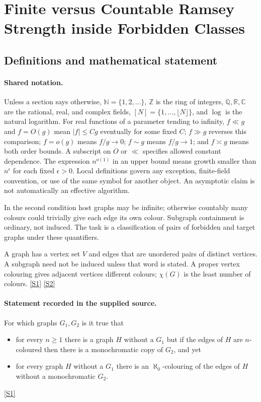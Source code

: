 \documentclass[11pt,a4paper]{article}
\newcommand{\N}{\mathbb{N}}
\newcommand{\Z}{\mathbb{Z}}
\newcommand{\Q}{\mathbb{Q}}
\newcommand{\R}{\mathbb{R}}
\newcommand{\C}{\mathbb{C}}
\newcommand{\sref}[2]{\hyperlink{source:#1:#2}{[S#2]}}
\begin{document}
\section{Finite versus Countable Ramsey Strength inside Forbidden Classes}\label{statement}


\subsection{Definitions and mathematical statement}

\paragraph{Shared notation.}Unless a section says otherwise, $\N=\{1,2,\ldots\}$,
$\Z$ is the ring of integers, $\Q,\R,\C$ are the rational, real, and complex
fields, $[N]=\{1,\ldots,\lfloor N\rfloor\}$, and $\log$ is the natural
logarithm. For real functions of a parameter tending to infinity,
$f\ll g$ and $f=O(g)$ mean $|f|\leq Cg$ eventually for some fixed $C$;
$f\gg g$ reverses this comparison; $f=o(g)$ means $f/g\to0$;
$f\sim g$ means $f/g\to1$; and $f\asymp g$ means both order bounds.
A subscript on $O$ or $\ll$ specifies allowed constant dependence.
The expression $n^{o(1)}$ in an upper bound means growth smaller than
$n^\epsilon$ for each fixed $\epsilon>0$. Local definitions govern any
exception, finite-field convention, or use of the same symbol for another
object. An asymptotic claim is not automatically an effective algorithm.



In the second condition host graphs may be infinite; otherwise countably many colours could trivially give each edge its own colour. Subgraph containment is ordinary, not induced. The task is a classification of pairs of forbidden and target graphs under these quantifiers.

A graph has a vertex set $V$ and edges that are unordered pairs of distinct vertices. A subgraph need not be induced unless that word is stated. A proper vertex colouring gives adjacent vertices different colours; $\chi(G)$ is the least number of colours. \sref{statement}{1} \sref{statement}{2}

\paragraph{Statement recorded in the supplied source.}
For which graphs $G_1,G_2$ is it true that
\begin{itemize}
\item  for every $n\geq 1$ there is a graph $H$ without a $G_1$ but if the edges of $H$ are $n$-coloured then there is a monochromatic copy of $G_2$, and yet
\item  for every graph $H$ without a $G_1$ there is an $\aleph_0$-colouring of the edges of $H$ without a monochromatic $G_2$.
\end{itemize} \sref{statement}{1}
\end{document}
